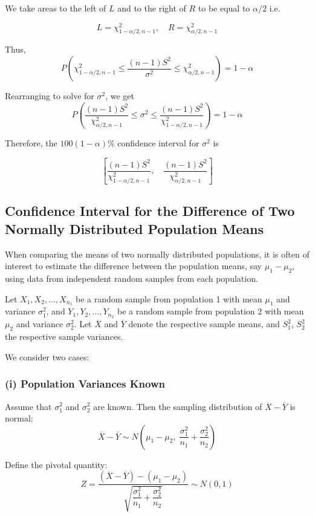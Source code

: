 \documentclass[twoside]{book}
\begin{document}
We take areas to the left of $L$ and to the right of $R$ to be equal to $\alpha/2$ i.e.

$$L = \chi_{1-\alpha/2, n-1}^2, \quad R = \chi_{\alpha/2, n-1}^2$$

Thus,
\[
P\left(\chi^2_{1-\alpha/2, n-1} \leq \frac{(n-1) S^2}{\sigma^2} \leq \chi^2_{\alpha/2, n-1}\right) = 1 - \alpha
\]

Rearranging to solve for $\sigma^2$, we get
\[
P\left(\frac{(n-1) S^2}{\chi^2_{\alpha/2, n-1}} \leq \sigma^2 \leq \frac{(n-1) S^2}{\chi^2_{1-\alpha/2, n-1}}\right) = 1 - \alpha
\]

Therefore, the $100(1-\alpha)\%$ confidence interval for $\sigma^2$ is
\begin{textbox}
\[
\left[\frac{(n-1) S^2}{\chi^2_{1-\alpha/2, n-1}}, \quad \frac{(n-1) S^2}{\chi^2_{\alpha/2, n-1}} \right]
\]
\end{textbox}

\subsection{Confidence Interval for the Difference of Two Normally Distributed Population Means}

When comparing the means of two normally distributed populations, it is often of interest to estimate the difference between the population means, say \(\mu_1 - \mu_2\), using data from independent random samples from each population.

Let \(X_1, X_2, \dots, X_{n_1}\) be a random sample from population 1 with mean \(\mu_1\) and variance \(\sigma_1^2\), and \(Y_1, Y_2, \dots, Y_{n_2}\) be a random sample from population 2 with mean \(\mu_2\) and variance \(\sigma_2^2\). Let \(\overline{X}\) and \(\overline{Y}\) denote the respective sample means, and \(S_1^2\), \(S_2^2\) the respective sample variances.

We consider two cases:

\subsubsection*{(i) Population Variances Known}

Assume that \(\sigma_1^2\) and \(\sigma_2^2\) are known. Then the sampling distribution of \(\overline{X} - \overline{Y}\) is normal:
\[
\overline{X} - \overline{Y} \sim N\left(\mu_1 - \mu_2,\; \frac{\sigma_1^2}{n_1} + \frac{\sigma_2^2}{n_2} \right)
\]

Define the pivotal quantity:
\[
Z = \dfrac{(\overline{X} - \overline{Y}) - (\mu_1 - \mu_2)}{\sqrt{\dfrac{\sigma_1^2}{n_1} + \dfrac{\sigma_2^2}{n_2}}} \sim N(0,1)
\]
\end{document}
